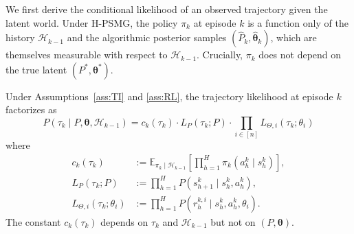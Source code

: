 We first derive the conditional likelihood of an observed trajectory given the latent world. Under H-PSMG, the policy $\pi_k$ at episode $k$ is a function only of the history $\mathcal{H}_{k-1}$ and the algorithmic posterior samples $(\hat{P}_k, \hat{\boldsymbol{\theta}}_k)$, which are themselves measurable with respect to $\mathcal{H}_{k-1}$. Crucially, $\pi_k$ does not depend on the true latent $(P^*, \boldsymbol{\theta}^*)$.

\begin{lemma}
\label{lem:likelihood}
Under Assumptions~\ref{ass:TI} and \ref{ass:RL}, the trajectory likelihood at episode $k$ factorizes as
\begin{equation}
\label{eq:lik-factor}
P(\tau_k \mid P, \boldsymbol{\theta}, \mathcal{H}_{k-1}) = c_k(\tau_k) \cdot L_P(\tau_k; P) \cdot \prod_{i \in [n]} L_{\Theta,i}(\tau_k; \theta_i)
\end{equation}
where
\begin{align}
c_k(\tau_k) &:= \mathbb{E}_{\pi_k \mid \mathcal{H}_{k-1}}\left[\prod_{h=1}^H \pi_k(a_h^k \mid s_h^k)\right], \label{eq:ck} \\
L_P(\tau_k; P) &:= \prod_{h=1}^H P(s_{h+1}^k \mid s_h^k, a_h^k), \label{eq:lp} \\
L_{\Theta,i}(\tau_k; \theta_i) &:= \prod_{h=1}^H P(r_h^{k,i} \mid s_h^k, a_h^k, \theta_i). \label{eq:ltheta}
\end{align}
The constant $c_k(\tau_k)$ depends on $\tau_k$ and $\mathcal{H}_{k-1}$ but not on $(P, \boldsymbol{\theta})$.
\end{lemma}

